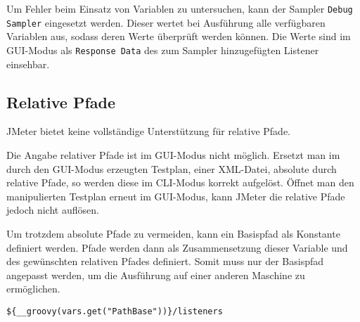 Um Fehler beim Einsatz von Variablen zu untersuchen,
kann der Sampler \texttt{Debug Sampler} eingesetzt werden.
Dieser wertet bei Ausführung alle verfügbaren Variablen aus, sodass deren Werte überprüft werden können.
Die Werte sind im GUI-Modus als \texttt{Response Data} des zum Sampler hinzugefügten Listener einsehbar.

\subsection{Relative Pfade}

JMeter bietet keine vollständige Unterstützung für relative Pfade.

Die Angabe relativer Pfade ist im GUI-Modus nicht möglich.
Ersetzt man im durch den GUI-Modus erzeugten Testplan, einer XML-Datei, absolute durch relative Pfade,
so werden diese im CLI-Modus korrekt aufgelöst.
Öffnet man den manipulierten Testplan erneut im GUI-Modus,
kann JMeter die relative Pfade jedoch nicht auflösen.

Um trotzdem absolute Pfade zu vermeiden,
kann ein Basispfad als Konstante definiert werden.
Pfade werden dann als Zusammensetzung dieser Variable und des gewünschten relativen Pfades definiert.
Somit muss nur der Basispfad angepasst werden, um die Ausführung auf einer anderen Maschine zu ermöglichen.

\begin{lstlisting}[caption=Workaround zur Angabe relativer Pfade]
    ${__groovy(vars.get("PathBase"))}/listeners
\end{lstlisting}
